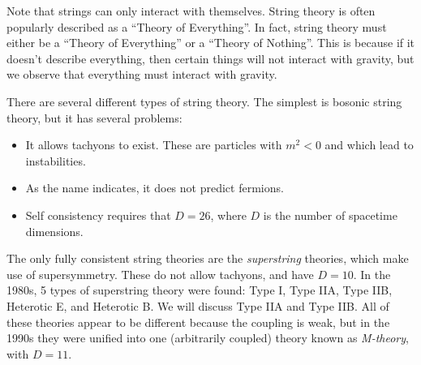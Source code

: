 \documentclass{jknotes}
\begin{document}
Note that strings can only interact with themselves. String theory is often popularly described as a ``Theory of Everything''. In fact, string theory must either be a ``Theory of Everything'' or a ``Theory of Nothing''. This is because if it doesn't describe everything, then certain things will not interact with gravity, but we observe that everything must interact with gravity.

There are several different types of string theory. The simplest is bosonic string theory, but it has several problems:
\begin{itemize}
    \item It allows tachyons to exist. These are particles with \(m^2 < 0\) and which lead to instabilities.
    \item As the name indicates, it does not predict fermions.
    \item Self consistency requires that \(D=26\), where \(D\) is the number of spacetime dimensions.
\end{itemize}

The only fully consistent string theories are the \emph{superstring} theories, which make use of supersymmetry. These do not allow tachyons, and have \(D=10\). In the 1980s, 5 types of superstring theory were found: Type I, Type IIA, Type IIB, Heterotic E, and Heterotic B. We will discuss Type IIA and Type IIB. All of these theories appear to be different because the coupling is weak, but in the 1990s they were unified into one (arbitrarily coupled) theory
known as \emph{M-theory}, with \(D=11\).
\end{document}
